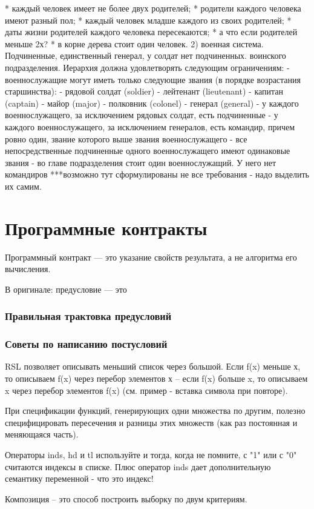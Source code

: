 \documentclass[14pt, twoside]{extreport}
\newcommand{\head}[1]{\vspace{1cm}\subsubsection*{#1}}
\begin{document}
    * каждый человек имеет не более двух родителей;
    * родители каждого человека имеют разный пол;
    * каждый человек младше каждого из своих родителей;
    * даты жизни родителей каждого человека пересекаются; * а что если родителей меньше 2х?
    * в корне дерева стоит один человек.
2) военная система. Подчиненные, единственный генерал, у солдат нет подчиненных. воинского подразделения. Иерархия должна удовлетворять следующим ограничениям:
- военнослужащие могут иметь только следующие звания (в порядке возрастания старшинства):
     - рядовой солдат (soldier)
     - лейтенант (lieutenant)
     - капитан (captain)
     - майор (major)
     - полковник (colonel)
     - генерал (general)
- у каждого военнослужащего, за исключением рядовых солдат, есть подчиненные
- у каждого военнослужащего, за исключением генералов, есть командир, причем ровно
один, звание которого выше звания военнослужащего
- все непосредственные подчиненные одного военнослужащего имеют одинаковые звания
- во главе подразделения стоит один военнослужащий. У него нет командиров
***возможно тут сформулированы не все требования - надо выделить их самим.



\section{Программные контракты}

Программный контракт --- это указание свойств результата, а не алгоритма его вычисления.

В оригинале: предусловие --- это


\head{Правильная трактовка предусловий}


\head{Советы по написанию постусловий}

RSL позволяет описывать меньший список через большой. Если f(x) меньше х, то описываем f(x) через перебор элементов х -- если f(x) больше x, то описываем x через перебор элементов f(x) (см. пример - вставка символа при повторе).

При спецификации функций, генерирующих одни множества по другим, полезно специфицировать пересечения и разницы этих множеств (как раз постоянная и меняющаяся часть).

Операторы inds, hd и tl используйте и тогда, когда не помните, с "1" или с "0" считаются индексы в списке. Плюс оператор inds дает дополнительную семантику переменной - что это индекс!

Композиция -- это способ построить выборку по двум критериям.
\end{document}
